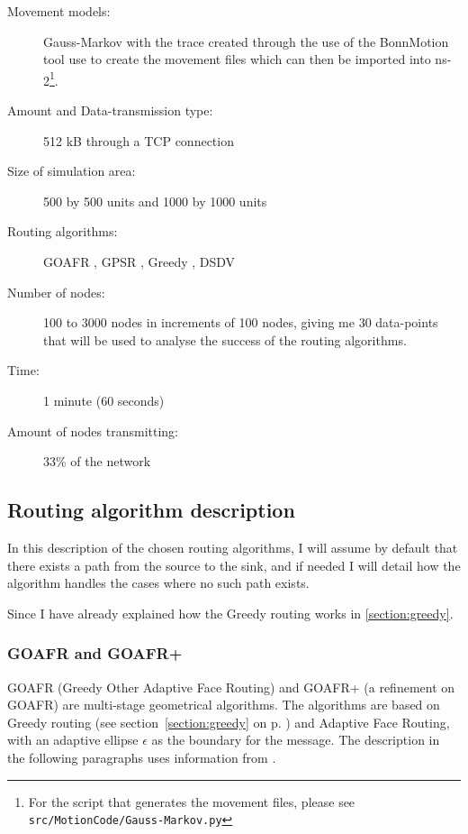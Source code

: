 \begin{description}
\item[Movement models:]  Gauss-Markov \cite{MobilityAdHocResearch} with the trace created through the use of the BonnMotion tool \cite{toilers} use to create the movement files which can then be imported into ns-2\footnote{For the script that generates the movement files, please see \texttt{src/MotionCode/Gauss-Markov.py}}.
\item[Amount and Data-transmission type:] 512 kB through a TCP connection
\item[Size of simulation area:] 500 by 500 units and 1000 by 1000 units
\item[Routing algorithms:] GOAFR \cite{gopher}, GPSR \cite{gpsr}, Greedy \cite{gopher}, DSDV \cite{DSDV}
\item[Number of nodes:] 100 to 3000 nodes in increments of 100 nodes, giving me 30 data-points that will be used to analyse the success of the routing algorithms. 
\item[Time:] 1 minute (60 seconds)
\item[Amount of nodes transmitting:] 33\% of the network
\end{description}

\subsection{Routing algorithm description}
\label{section:routing_algorithm}
In this description of the chosen routing algorithms, I will assume by default that there exists a path from the source to the sink, and if needed I will detail how the algorithm handles the cases where no such path exists.

Since I have already explained how the Greedy routing works in \ref{section:greedy}.

\subsubsection{GOAFR and GOAFR+}

GOAFR \cite{gopher} (Greedy Other Adaptive Face Routing) and GOAFR+ \cite{gopher+} (a refinement on GOAFR) are multi-stage geometrical algorithms. The algorithms are based on Greedy routing (see section~\ref{section:greedy} on p. \pageref{section:greedy}) and Adaptive Face Routing, with an adaptive ellipse $\epsilon$ as the boundary for the message. The description in the following paragraphs uses information from \cite{gopher}.

